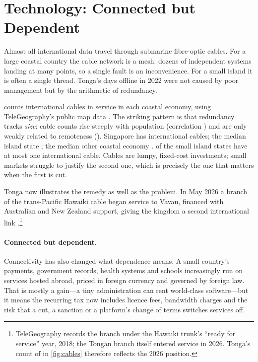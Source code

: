 \section{Technology: Connected but Dependent}
\label{sec:tech}

Almost all international data travel through submarine fibre-optic cables.
For a large coastal country the cable network is a mesh: dozens of
independent systems landing at many points, so a single fault is an
inconvenience. For a small island it is often a single thread. Tonga's
\tongaOutageDays{} days offline in 2022 were not caused by poor management
but by the arithmetic of redundancy.



 counts international cables in service in each coastal
economy, using TeleGeography's public map data \parencite{telegeography2026}.
The striking pattern is that redundancy tracks \emph{size}: cable counts rise
steeply with population (correlation \corrCablesPop) and are only weakly
related to remoteness (\corrCablesRemote). Singapore has \cablesSingapore{}
international cables; the median island state \cablesSIDSMedian{}; the median
other coastal economy \cablesOtherMedian. \nSIDSOneCable{} of the
\nSIDScables{} small island states have at most one international cable. Cables
are lumpy, fixed-cost investments; small markets struggle to justify the
second one, which is precisely the one that matters when the first is cut.

Tonga now illustrates the remedy as well as the problem. In May 2026 a branch
of the trans-Pacific Hawaiki cable began service to Vava\okina u, financed with
Australian and New Zealand support, giving the kingdom a second international
link \parencite{aiffp2026tonga}.\footnote{TeleGeography records the branch
under the Hawaiki trunk's \enquote{ready for service} year, 2018; the Tongan
branch itself entered service in 2026. Tonga's count of \cablesTonga{} in
\cref{fig:cables} therefore reflects the 2026 position.}

\paragraph{Connected but dependent.} Connectivity has also changed what
dependence means. A small country's payments, government records, health
systems and schools increasingly run on services hosted abroad, priced in
foreign currency and governed by foreign law. That is mostly a gain---a tiny
administration can rent world-class software---but it means the recurring tax
now includes licence fees, bandwidth charges and the risk that a cut, a
sanction or a platform's change of terms switches services off.

